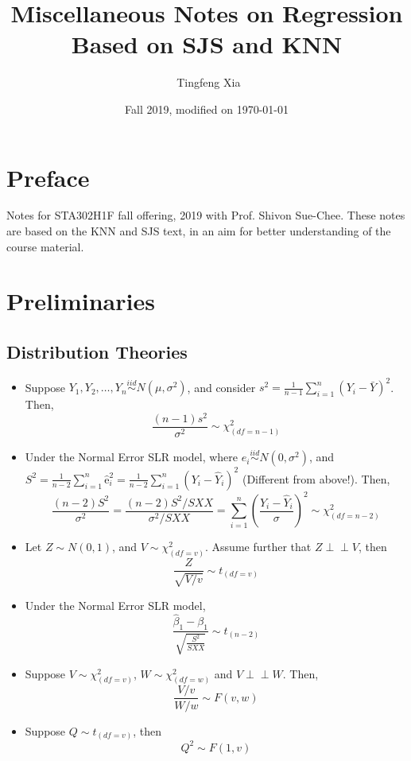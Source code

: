 \documentclass[11pt]{article}
\title{\LARGE{Miscellaneous Notes on Regression}\\ \normalsize{Based on SJS and KNN}}
\author{\ccLogo \,\,Tingfeng Xia}
\date{Fall 2019, modified on \today}
\newcommand{\independent}{\perp \!\!\! \perp}
\begin{document}
\maketitle
\section*{Preface}
Notes for STA302H1F fall offering, 2019 with Prof. Shivon Sue-Chee. These notes are based on the KNN and SJS text, in an aim for better understanding of the course material.
\doclicenseThis
\tableofcontents
\newpage

\section{Preliminaries}
\subsection{Distribution Theories}
\begin{itemize}
    \item Suppose $Y_1, Y_2 ,\dots, Y_n \overset{iid}{\sim} N(\mu, \sigma^2)$, and consider $s^{2}=\frac{1}{n-1} \sum_{i=1}^{n}\left(Y_{i}-\bar{Y}\right)^{2}$. Then,
        \begin{equation*}
            \frac{(n-1) s^{2}}{\sigma^{2}} \sim \chi^{2}_{(d f=n-1)}
        \end{equation*}
    \item Under the Normal Error SLR model, where $e_{i} \overset{iid}{\sim} N\left(0, \sigma^{2}\right)$, and $S^{2}=\frac{1}{n-2} \sum_{i=1}^{n} \hat{\mathrm{e}}_{i}^{2}=\frac{1}{n-2} \sum_{i=1}^{n}\left(Y_{i}-\hat{Y}_{i}\right)^{2}$ (Different from above!). Then,
        \begin{equation*}
            \frac{(n-2) S^{2}}{\sigma^{2}}=\frac{(n-2) S^{2} / S X X}{\sigma^{2} / S X X}=\sum_{i=1}^{n}\left(\frac{Y_{i}-\hat{Y}_{i}}{\sigma}\right)^{2} \sim \chi^{2}_{(d f=n-2)}
        \end{equation*}
    \item Let $Z\sim N(0,1)$, and $V\sim \chi^2_{(df=v)}$. Assume further that $Z\independent V$, then
        \begin{equation*}
            \frac{Z}{\sqrt{V / v}} \sim t_{(df=v)}
        \end{equation*}
    \item Under the Normal Error SLR model,
        \begin{equation*}
            \frac{\hat{\beta}_{1}-\beta_{1}}{\sqrt{\frac{S^{2}}{S X X}}} \sim t_{(n-2)}
        \end{equation*}
    \item Suppose $V \sim \chi_{(df=v)}^{2}$, $W \sim \chi_{(df=w)}^2$ and $V\independent W$. Then,
        \begin{equation*}
            \frac{V / v}{W / w} \sim F(v, w)
        \end{equation*}
    \item Suppose $Q\sim t_{(df=v)}$, then
        \begin{equation*}
            Q^2 \sim F(1,v)
        \end{equation*}
\end{itemize}
\end{document}
